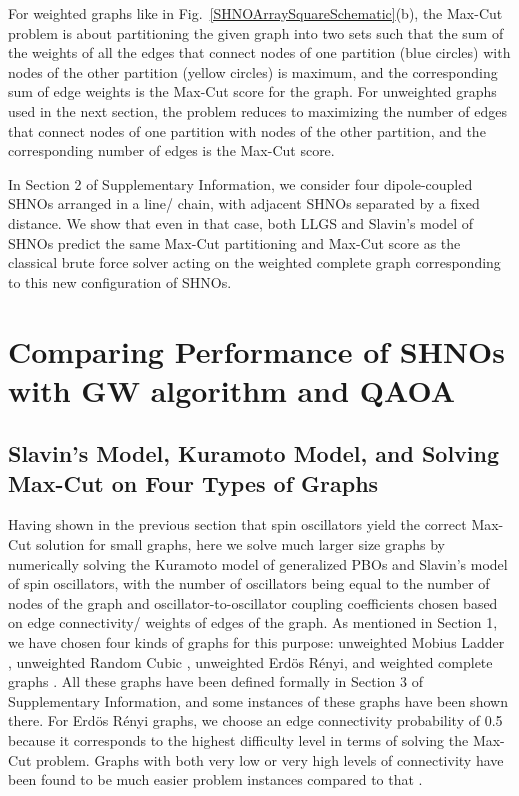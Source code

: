 \documentclass[10pt]{article}
\begin{document}
For weighted graphs like in Fig.~\ref{SHNOArraySquareSchematic}(b), the Max-Cut problem is about partitioning the given graph into two sets such that the sum of the weights of all the edges that connect nodes of one partition (blue circles) with nodes of the other partition (yellow circles) is maximum, and the corresponding sum of edge weights is the Max-Cut score for the graph. For unweighted graphs used in the next section, the problem reduces to maximizing the number of edges that connect nodes of one partition with nodes of the other partition, and the corresponding number of edges is the Max-Cut score. 

In Section 2 of Supplementary Information, we consider four dipole-coupled SHNOs arranged in a line/ chain, with adjacent SHNOs separated by a fixed distance. We show that even in that case, both LLGS and Slavin's model of SHNOs predict the same Max-Cut partitioning and Max-Cut score as the classical brute force solver acting on the weighted complete graph corresponding to this new configuration of SHNOs. 


\section{Comparing Performance of SHNOs with GW algorithm and QAOA}

\subsection{Slavin's Model, Kuramoto Model, and Solving Max-Cut on Four Types of Graphs}

Having shown in the previous section that spin oscillators yield the correct Max-Cut solution for small graphs, here we solve much larger size graphs by numerically solving the Kuramoto model of generalized PBOs and Slavin's model of spin oscillators, with the number of oscillators being equal to the number of nodes of the graph and oscillator-to-oscillator coupling coefficients chosen based on edge connectivity/ weights of edges of the graph. As mentioned in Section 1, we have chosen four kinds of graphs for this purpose: unweighted Mobius Ladder \cite{Ref_MobiusLadder}, unweighted Random Cubic \cite{Ref_RandomCubic}, unweighted Erd{\"o}s R{\'e}nyi\cite{Ref_ErdosRenyi}, and weighted complete graphs \cite{Ref_CompleteGraph}.  All these graphs have been defined formally in Section 3 of Supplementary Information, and some instances of these graphs have been shown there. For Erd{\"o}s R{\'e}nyi graphs, we choose an edge connectivity probability of 0.5 because it corresponds to the highest difficulty level in terms of solving the Max-Cut problem. Graphs with both very low or very high levels of connectivity have been found to be much easier problem instances compared to that \cite{QAOA_ErdosRenyi}.
\end{document}
